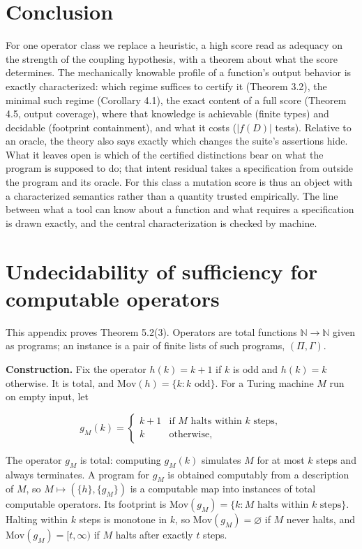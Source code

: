 \documentclass[conference]{IEEEtran}
\newcommand{\Mov}{\mathrm{Mov}}
\theoremstyle{run}
\begin{document}
\section{Conclusion}
For one operator class we replace a heuristic, a high score read as adequacy on the strength of the coupling hypothesis, with a theorem about what the score determines. The mechanically knowable profile of a function's output behavior is exactly characterized: which regime suffices to certify it (Theorem 3.2), the minimal such regime (Corollary 4.1), the exact content of a full score (Theorem 4.5, output coverage), where that knowledge is achievable (finite types) and decidable (footprint containment), and what it costs ($|f(D)|$ tests). Relative to an oracle, the theory also says exactly which changes the suite's assertions hide. What it leaves open is which of the certified distinctions bear on what the program is supposed to do; that intent residual takes a specification from outside the program and its oracle. For this class a mutation score is thus an object with a characterized semantics rather than a quantity trusted empirically. The line between what a tool can know about a function and what requires a specification is drawn exactly, and the central characterization is checked by machine.

\appendices
\setcounter{section}{0}
\section{Undecidability of sufficiency for computable operators}
This appendix proves Theorem 5.2(3). Operators are total functions $\mathbb{N} \to \mathbb{N}$ given as programs; an instance is a pair of finite lists of such programs, $(\Pi, \Gamma)$.

\textbf{Construction.} Fix the operator $h(k) = k + 1$ if $k$ is odd and $h(k) = k$ otherwise. It is total, and $\Mov(h) = \{k : k \text{ odd}\}$. For a Turing machine $M$ run on empty input, let

\[ g_M(k) = \begin{cases} k + 1 & \text{if } M \text{ halts within } k \text{ steps},\\ k & \text{otherwise,} \end{cases} \]

The operator $g_M$ is total: computing $g_M(k)$ simulates $M$ for at most $k$ steps and always terminates. A program for $g_M$ is obtained computably from a description of $M$, so $M \mapsto (\{h\}, \{g_M\})$ is a computable map into instances of total computable operators. Its footprint is $\Mov(g_M) = \{k : M \text{ halts within } k \text{ steps}\}$. Halting within $k$ steps is monotone in $k$, so $\Mov(g_M) = \varnothing$ if $M$ never halts, and $\Mov(g_M) = [t, \infty)$ if $M$ halts after exactly $t$ steps.
\end{document}
